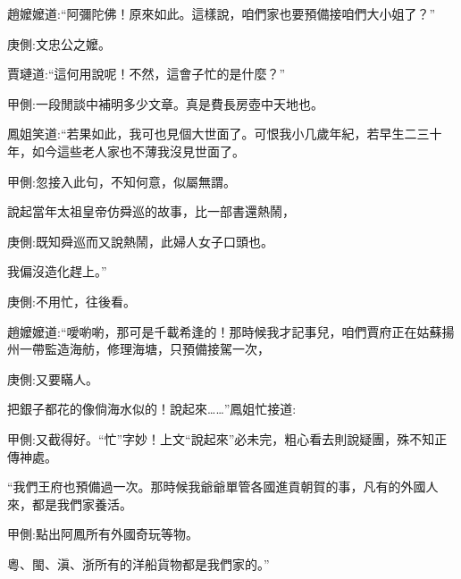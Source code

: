 \begin{parag}
    趙嬤嬤道:“阿彌陀佛！原來如此。這樣說，咱們家也要預備接咱們大小姐了？”\begin{note}庚側:文忠公之嬤。\end{note}賈璉道:“這何用說呢！不然，這會子忙的是什麼？”\begin{note}甲側:一段閒談中補明多少文章。真是費長房壺中天地也。\end{note}鳳姐笑道:“若果如此，我可也見個大世面了。可恨我小几歲年紀，若早生二三十年，如今這些老人家也不薄我沒見世面了。\begin{note}甲側:忽接入此句，不知何意，似屬無謂。\end{note}說起當年太祖皇帝仿舜巡的故事，比一部書還熱鬧，\begin{note}庚側:既知舜巡而又說熱鬧，此婦人女子口頭也。\end{note}我偏沒造化趕上。”\begin{note}庚側:不用忙，往後看。\end{note}趙嬤嬤道:“噯喲喲，那可是千載希逢的！那時候我才記事兒，咱們賈府正在姑蘇揚州一帶監造海舫，修理海塘，只預備接駕一次，\begin{note}庚側:又要瞞人。\end{note}把銀子都花的像倘海水似的！說起來……”鳳姐忙接道:\begin{note}甲側:又截得好。“忙”字妙！上文“說起來”必未完，粗心看去則說疑團，殊不知正傳神處。\end{note}“我們王府也預備過一次。那時候我爺爺單管各國進貢朝賀的事，凡有的外國人來，都是我們家養活。\begin{note}甲側:點出阿鳳所有外國奇玩等物。\end{note}粵、閩、滇、浙所有的洋船貨物都是我們家的。”
\end{parag}


